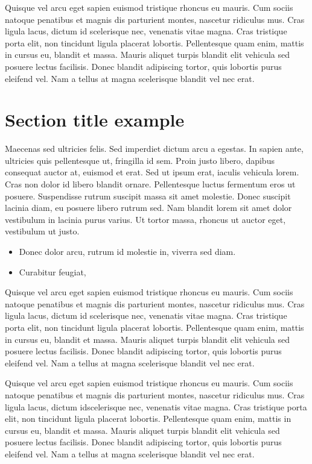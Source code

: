 \documentclass[a4paper,10pt,parskip,twocolumn]{article}
\begin{document}
Quisque vel arcu eget sapien euismod tristique rhoncus eu mauris. Cum sociis natoque penatibus et magnis dis parturient montes, nascetur ridiculus mus. Cras ligula lacus, dictum id scelerisque nec, venenatis vitae magna. Cras tristique porta elit, non tincidunt ligula placerat lobortis. Pellentesque quam enim, mattis in cursus eu, blandit et massa. Mauris aliquet turpis blandit elit vehicula sed posuere lectus facilisis. Donec blandit adipiscing tortor, quis lobortis purus eleifend vel. Nam a tellus at magna scelerisque blandit vel nec erat.

\section{Section title example}
Maecenas sed ultricies felis. Sed imperdiet dictum arcu a egestas. \cite{berndtsson_thesis_2008}
In sapien ante, ultricies quis pellentesque ut, fringilla id sem. Proin justo libero, dapibus consequat auctor at, euismod et erat. Sed ut ipsum erat, iaculis vehicula lorem. Cras non dolor id libero blandit ornare. Pellentesque luctus fermentum eros ut posuere. Suspendisse rutrum suscipit massa sit amet molestie. Donec suscipit lacinia diam, eu posuere libero rutrum sed. Nam blandit lorem sit amet dolor vestibulum in lacinia purus varius. Ut tortor massa, rhoncus ut auctor eget, vestibulum ut justo.


\begin{itemize}
\item Donec dolor arcu, rutrum id molestie in, viverra sed diam.
\item Curabitur feugiat, 

\end{itemize}
Quisque vel arcu eget sapien euismod tristique rhoncus eu mauris. Cum sociis natoque penatibus et magnis dis parturient montes, nascetur ridiculus mus. Cras ligula lacus, dictum id scelerisque nec, venenatis vitae magna. Cras tristique porta elit, non tincidunt ligula placerat lobortis. Pellentesque quam enim, mattis in cursus eu, blandit et massa. Mauris aliquet turpis blandit elit vehicula sed posuere lectus facilisis. Donec blandit adipiscing tortor, quis lobortis purus eleifend vel. Nam a tellus at magna scelerisque blandit vel nec erat.

Quisque vel arcu eget sapien euismod tristique rhoncus eu mauris. Cum sociis natoque penatibus et magnis dis parturient montes, nascetur ridiculus mus. Cras ligula lacus, dictum idscelerisque nec, venenatis vitae magna. Cras tristique porta elit, non tincidunt ligula placerat lobortis. Pellentesque quam enim, mattis in cursus eu, blandit et massa. Mauris aliquet turpis blandit elit vehicula sed posuere lectus facilisis. Donec blandit adipiscing tortor, quis lobortis purus eleifend vel. Nam a tellus at magna scelerisque blandit vel nec erat.
\end{document}
